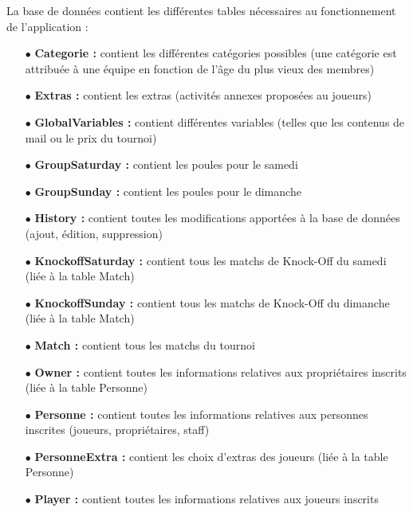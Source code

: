 \documentclass{article}
\begin{document}
La  base  de  données  contient  les  différentes  tables  nécessaires  au  fonctionnement  de l’application :

\begin{itemize}
\item[$\bullet$]{\textbf{Categorie :}} contient les différentes catégories possibles (une catégorie est attribuée
 à une équipe en fonction de l’âge du plus vieux des membres)

\item[$\bullet$]{\textbf{Extras :}} contient les extras (activités annexes proposées au joueurs)

\item[$\bullet$]{\textbf{GlobalVariables :}} contient différentes variables (telles que les contenus de mail ou le prix du tournoi)

\item[$\bullet$]{\textbf{GroupSaturday :}} contient les poules pour le samedi

\item[$\bullet$]{\textbf{GroupSunday :}} contient les poules pour le dimanche

\item[$\bullet$]{\textbf{History  :}}  contient  toutes  les  modifications  apportées  à  la  base  de  données (ajout, édition, suppression)

\item[$\bullet$]{\textbf{KnockoffSaturday :}} contient tous les matchs de Knock-Off du samedi (liée à la table Match)

\item[$\bullet$]{\textbf{KnockoffSunday  :}}  contient  tous  les  matchs  de  Knock-Off  du  dimanche  (liée  à  la table Match)

\item[$\bullet$]{\textbf{Match :}} contient tous les matchs du tournoi

\item[$\bullet$]{\textbf{Owner :}} contient toutes les informations relatives aux propriétaires inscrits (liée à la table Personne)

\item[$\bullet$]{\textbf{Personne  :}}  contient  toutes  les  informations  relatives  aux  personnes  inscrites (joueurs, propriétaires, staff)

\item[$\bullet$]{\textbf{PersonneExtra :}} contient les choix d’extras des joueurs (liée à la table Personne)

\item[$\bullet$]{\textbf{Player :}} contient toutes les informations relatives aux joueurs inscrits


\end{itemize}
\end{document}
